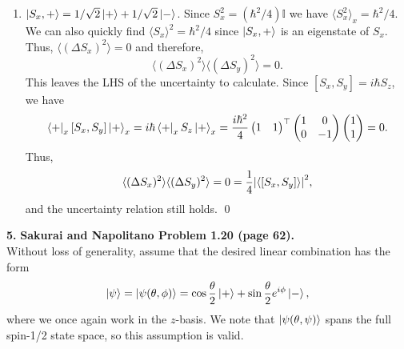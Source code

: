 \documentclass{article}
\theoremstyle{definition}
\newcommand{\f}[2]{\frac{#1}{#2}}
\begin{document}
\begin{enumerate}[label=(\alph*)]
	\item $\ket{S_x,+} = 1/\sqrt{2}\ket{+} + 1/\sqrt{2}\ket{-}$. Since $S_x^2 = (\hbar^2/4)\mathbb{I}$ we have $\langle S_x^2  \rangle_x = \hbar^2/4$. We can also quickly find $\langle S_x \rangle^2 = \hbar^2/4$ since $\ket{S_x,+}$ is an eigenstate of $S_x$. Thus, $\langle (\Delta S_x)^2 \rangle = 0$ and therefore, 
	\begin{equation*}
	\langle (\Delta S_x)^2\rangle \langle (\Delta S_y)^2\rangle = 0.
	\end{equation*}
	This leaves the LHS of the uncertainty to calculate. Since $[S_x, S_y] = i\hbar S_z$, we have
	\begin{equation*}
	\bra{+}_x [S_x, S_y] \ket{+}_x = i\hbar \bra{+}_x S_z  \ket{+}_x = \f{i\hbar^2}{4 }\begin{pmatrix}
	1 & 1
	\end{pmatrix}^\top \begin{pmatrix}
	1 & 0 \\ 0 & -1
	\end{pmatrix}  
	\begin{pmatrix}
	1 \\ 1
	\end{pmatrix} = 0.
	\end{equation*}
	Thus, 
	\begin{equation*}
	\langle (\Delta S_x)^2\rangle \langle (\Delta S_y)^2\rangle = 0 = \f{1}{4} \abs{\langle [S_x, S_y] \rangle}^2,
	\end{equation*}
	and the uncertainty relation still holds. \qed
\end{enumerate}
	
	
	
	
\newpage




\noindent \textbf{5.} \textbf{Sakurai and Napolitano Problem 1.20 (page 62).} \\


Without loss of generality, assume that the desired linear combination has the form 
\begin{align*}
\ket{\psi} = \ket{\psi(\theta,\phi)} = \cos\f{\theta}{2} \ket{+} + \sin\f{\theta}{2}e^{i\phi} \ket{-},
\end{align*}
where we once again work in the $z$-basis. We note that $\ket{\psi(\theta,\psi)}$ spans the full spin-1/2 state space, so this assumption is valid.\\
\end{document}
